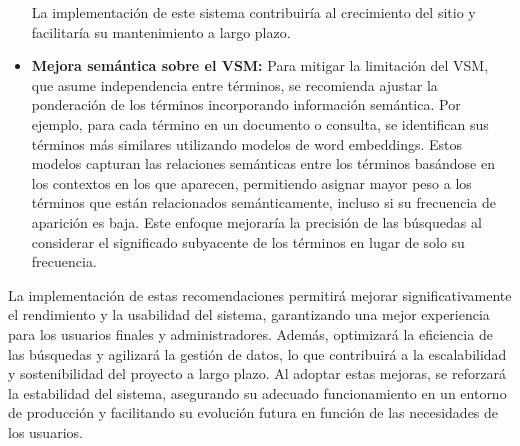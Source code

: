 \begin{recomendations}
\begin{itemize}
        La implementación de este sistema contribuiría al crecimiento del sitio y facilitaría su mantenimiento a largo plazo.
        \item \textbf{Mejora semántica sobre el VSM:}
        Para mitigar la limitación del VSM, que asume independencia entre términos, se recomienda ajustar la ponderación de los términos 
        incorporando información semántica. Por ejemplo, para cada término en un documento o consulta, se identifican sus términos 
        más similares utilizando modelos de word embeddings. Estos modelos capturan las relaciones semánticas entre los términos basándose 
        en los contextos en los que aparecen, permitiendo asignar mayor peso a los términos que están relacionados semánticamente, incluso 
        si su frecuencia de aparición es baja. Este enfoque mejoraría la precisión de las búsquedas al considerar el significado subyacente 
        de los términos en lugar de solo su frecuencia.

    \end{itemize}
    La implementación de estas recomendaciones permitirá mejorar significativamente el rendimiento y la usabilidad del sistema, 
    garantizando una mejor experiencia para los usuarios finales y administradores. Además, optimizará la eficiencia de las búsquedas 
    y agilizará la gestión de datos, lo que contribuirá a la escalabilidad y sostenibilidad del proyecto a largo plazo. Al adoptar 
    estas mejoras, se reforzará la estabilidad del sistema, asegurando su adecuado funcionamiento en un entorno de producción y 
    facilitando su evolución futura en función de las necesidades de los usuarios.
\end{recomendations}
